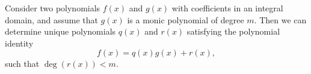 

\begin{theorem}\label{theorem:euclidean-division-polynomials}
  Consider two polynomials $f(x)$ and $g(x)$ with coefficients in an integral domain, and assume that $g(x)$ is a monic polynomial of degree $m$. Then we can determine unique polynomials $q(x)$ and $r(x)$ satisfying the polynomial identity
  \begin{equation*}
    f(x)=q(x)g(x)+r(x),
  \end{equation*}
  such that $\deg(r(x))<m$.
\end{theorem}

